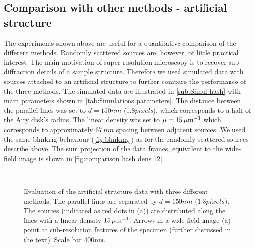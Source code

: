 \subsection{Comparison with other methods - artificial structure\label{sub:results - comparison - structure}}
The experiments shown above are useful for a quantitative comparison of the different methods. Randomly scattered sources are, however, of little practical interest. The main motivation of super-resolution microscopy is to recover sub-diffraction details of a sample structure. Therefore we used simulated data with sources attached to an artificial structure to further compare the performance of the three methods. The simulated data are illustrated in \autoref{sub:Simul hash} with main parameters shown in \autoref{tab:Simulations parameters}. The distance between the parallel lines was set to $d=150\unit{nm}$ ($1.8 \unit{pixels}$), which corresponds to a half of the Airy disk's radius. The linear density was set to $\mu = 15\, \mathrm{\mu m}^{-1}$ which corresponds to approximately $67\ \unit{nm}$ spacing between adjacent sources. We used the same blinking behaviour (\autoref{fig:blinking}\ddd) as for the randomly scattered sources describe above. The sum projection of the data frames, equivalent to the wide-field image is shown in \autoref{fig:comparison hash dens 12}\aaa.
%
\begin{figure}[!h]
	\centering
	\newcommand{\sizef}{.95}
	\newcommand{\wf}{.45\textwidth}
	\\
	\caption{Evaluation of the artificial structure data with three different methods. The parallel lines are separated by $d=150 \unit{nm}$ ($1.8 \unit{pixels}$). The sources (indicated as red dots in (a)) are distributed along the lines with a linear density $15 \, \mathrm{\mu m}^{-1}$. Arrows in a wide-field image (a) point at sub-resolution features of the specimen (further discussed in the text). Scale bar 400\unit{nm}.}
	\label{fig:comparison hash dens 12}
\end{figure}
%

